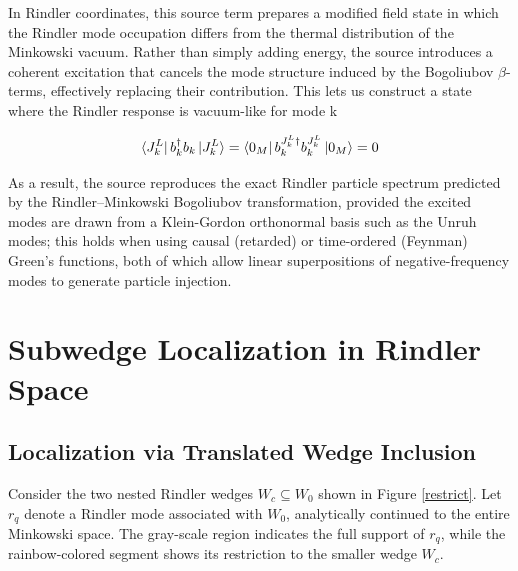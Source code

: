 \documentclass[12pt,a4paper]{article}
\begin{document}
In Rindler coordinates, this source term prepares a modified field state in which the Rindler mode occupation differs from the thermal distribution of the Minkowski vacuum. Rather than simply adding energy, the source introduces a coherent excitation that cancels the mode structure induced by the Bogoliubov $\beta$-terms, effectively replacing their contribution. This lets us construct a state where the Rindler response is vacuum-like for mode k

\begin{equation}
  \bra{J_k^L}  b_k^{\dagger} b_k \ket{J_k^L} = \bra{0_M}  b_k^{J_k^L \dagger} b^{J_k^L}_k \ket{0_M} = 0
\end{equation}

As a result, the source reproduces the exact Rindler particle spectrum predicted by the Rindler–Minkowski Bogoliubov transformation, provided the excited modes are drawn from a Klein-Gordon orthonormal basis such as the Unruh modes; this holds when using causal (retarded) or time-ordered (Feynman) Green’s functions, both of which allow linear superpositions of negative-frequency modes to generate particle injection.

\section{Subwedge Localization in Rindler Space}
\subsection{Localization via Translated Wedge Inclusion}

Consider the two nested Rindler wedges $W_c \subseteq W_0$ shown in Figure \ref{restrict}. Let $r_q$ denote a Rindler mode associated with $W_0$, analytically continued to the entire Minkowski space. The gray-scale region indicates the full support of $r_q$, while the rainbow-colored segment shows its restriction to the smaller wedge $W_c$.
\end{document}
